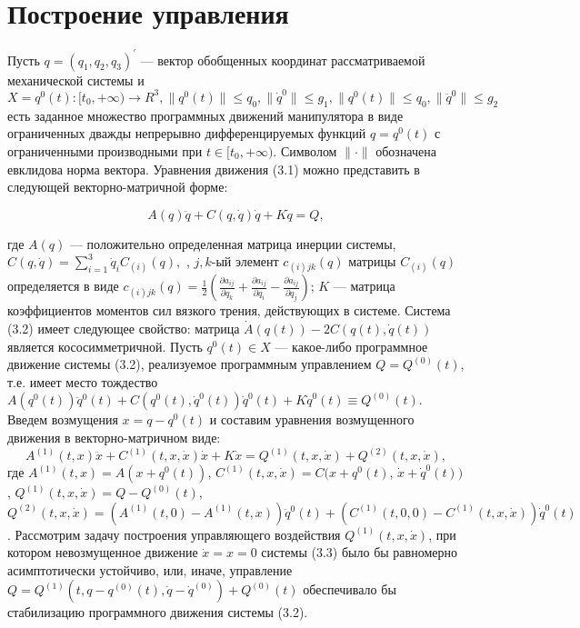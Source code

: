  \section{Построение управления}%
 \label{sec2.3}
 Пусть  $q = (q_1, q_2, q_3)^{'}$ --- вектор обобщенных координат рассматриваемой механической системы и $X = {q^0(t):[t_0, + \infty) \to R^3, \| q^0(t) \| \le q_0, \| \dot q^0 \| \le g_1,\| q^0(t) \| \le q_0, \| \ddot q^0 \| \le g_2}$ есть заданное множество программных движений манипулятора в виде ограниченных дважды непрерывно дифференцируемых функций $q = q^0(t)$ с ограниченными производными при $t \in [t_0, + \infty)$.  Символом   $\| \cdot \|$ обозначена евклидова норма вектора. Уравнения движения (3.1) можно представить в следующей векторно-матричной форме: 
 
 \begin{equation}
 A(q) \ddot q + C(q, \dot q) \dot q + K \dot q = Q,     
 \end{equation}

 где $A(q)$ --- положительно определенная матрица инерции системы, $C(q, \dot q) = \sum_{i = 1}^{3} \dot q_i C_{(i)} (q),$ , $j,k$-ый элемент $c_{(i)jk} (q)$ матрицы $C_{(i)}(q)$  определяется в виде $c_{(i)jk} (q) = \frac12 (\frac{\partial a_{ij}}{\partial q_k} + \frac{\partial a_{ij}}{\partial q_i} - \frac{\partial a_{ij}}{\partial q_j} )$;
 $K$ --- матрица коэффициентов моментов сил вязкого трения, действующих в системе.
 Система (3.2) имеет следующее свойство: матрица $\dot A(q(t)) - 2 C(q(t), \dot q(t))$  является  кососимметричной.
 Пусть $q^0(t) \in X$ --- какое-либо программное движение системы (3.2), реализуемое программным управлением $Q = Q^{(0)}(t)$, т.е. имеет место тождество $A(q^0(t)) \ddot q^0(t) + C(q^0(t), \dot q^0(t)) \dot q^0(t) + K \dot q^0(t) \equiv Q^{(0)}(t)$.
 Введем возмущения $x = q - q^0(t)$ и составим уравнения возмущенного движения в векторно-матричном виде:
 \begin{equation}
 A^{(1)}(t, x) \ddot x + C^{(1)}(t, x, \dot x) \dot x + K \dot x = Q^{(1)}(t, x, \dot x) + Q^{(2)}(t, x, \dot x),
 \end{equation} 
 где $A^{(1)}(t, x) = A(x + q^0(t))$, $C^{(1)}(t, x, \dot x) = C(x + q^0(t)$, $\dot x + \dot q^0(t))$, $Q^{(1)}(t, x, \dot x) = Q - Q^{(0)}(t)$, $Q^{(2)}(t, x, \dot x) = (A^{(1)}(t, 0) - A^{(1)}(t, x)) \ddot q^0(t) + (C^{(1)}(t, 0, 0) - C^{(1)}(t, x, \dot x)) \dot q^0(t)$.
 Рассмотрим задачу построения управляющего воздействия $Q^{(1)}(t, x, \dot x)$, при котором невозмущенное движение $\dot x = x = 0$ системы (3.3) было бы равномерно асимптотически устойчиво, или, иначе, управление $Q = Q^{(1)}(t, q-q^{(0)}(t), \dot q - \dot q^{(0)}) + Q^{(0)}(t)$ обеспечивало бы стабилизацию программного движения   системы (3.2).
 
